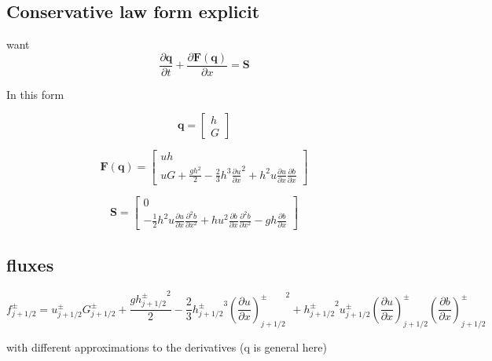\documentclass[12pt]{article}
\renewcommand{\vec}[1]{\mathbf{#1}}
\begin{document}
\subsection{Conservative law form explicit}
want
\[\frac{\partial \vec{q}}{\partial t} + \frac{\partial \vec{F(\vec{q})}}{\partial x} = \vec{S}\]

In this form

\[\vec{q} = \left[\begin{array}{c}
h  \\ G
\end{array}\right]\]

\[\vec{F(\vec{q})} = \left[\begin{array}{c}
u h  \\ u G + \frac{gh^2}{2} - \frac{2}{3}h^3 \frac{\partial u}{\partial x}^2 + h^2 u\frac{\partial u}{\partial x}\frac{\partial b}{\partial x}
\end{array}\right]\]

\[\vec{S} = \left[\begin{array}{c}
0 \\ -\frac{1}{2}h^2 u \frac{\partial u}{\partial x} \frac{\partial^2 b}{\partial x^2}  + h u^2\frac{\partial b}{\partial x}\frac{\partial^2 b}{\partial x^2} - gh\frac{\partial b}{\partial x}
\end{array}\right]\]

\subsection{fluxes}

\[f^\pm_{j + 1/2} = u^\pm_{j + 1/2} G^\pm_{j + 1/2} + \frac{g{h^\pm_{j + 1/2}}^2}{2} - \frac{2}{3}{h^\pm_{j + 1/2}}^3 {\left(\frac{\partial u}{\partial x}\right)^\pm_{j + 1/2}}^2 + {h^\pm_{j + 1/2}}^2 u^\pm_{j + 1/2} \left(\frac{\partial u}{\partial x}\right)^\pm_{j + 1/2}\left(\frac{\partial b}{\partial x}\right)^\pm_{j + 1/2}\]

with different approximations to the derivatives (q is general here)
\end{document}
